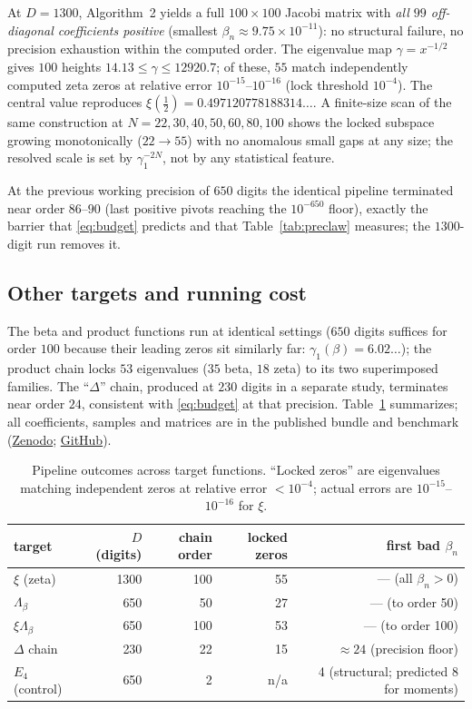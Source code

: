 \documentclass[11pt]{article}
\theoremstyle{definition}
\begin{document}
At $D=1300$, Algorithm~2 yields a full $100\times100$
Jacobi matrix with \emph{all $99$ off-diagonal coefficients
positive} (smallest $\beta_n\approx 9.75\times10^{-11}$): no
structural failure, no precision exhaustion within the computed
order. The eigenvalue map $\gamma=x^{-1/2}$ gives $100$ heights
$14.13\le\gamma\le 12920.7$; of these, $55$ match independently
computed zeta zeros at relative error $10^{-15}$--$10^{-16}$
(lock threshold $10^{-4}$). The central value reproduces
$\xi(\tfrac12)=0.497120778188314\ldots$. A finite-size scan of the
same construction at $N=22,30,40,50,60,80,100$ shows the locked
subspace growing monotonically ($22\to55$) with no anomalous small
gaps at any size; the resolved scale is set by $\gamma_1^{-2N}$, not
by any statistical feature.

At the previous working precision of $650$ digits the identical
pipeline terminated near order $86$--$90$ (last positive pivots
reaching the $10^{-650}$ floor), exactly the barrier that
\eqref{eq:budget} predicts and that Table~\ref{tab:preclaw}
measures; the $1300$-digit run removes it.

\subsection{Other targets and running cost}

The beta and product functions run at identical settings ($650$
digits suffices for order $100$ because their leading zeros sit
similarly far: $\gamma_1(\beta)=6.02\ldots$); the product chain
locks $53$ eigenvalues ($35$ beta, $18$ zeta) to its two
superimposed families. The ``$\Delta$'' chain, produced at $230$
digits in a separate study, terminates near order $24$, consistent
with \eqref{eq:budget} at that precision. Table~\ref{tab:targets}
summarizes; all coefficients, samples and matrices are in the
published bundle and benchmark
(\href{https://doi.org/10.5281/zenodo.22181443}{Zenodo};
\href{https://github.com/maomao8412/hilbert-polya-jacobi}{GitHub}).

\begin{table}[ht]\centering\small
\begin{tabular}{lrrrr}
\toprule
target & $D$ (digits) & chain order & locked zeros & first bad $\beta_n$\\
\midrule
$\xi$ (zeta)        & 1300 & 100 & 55 & --- (all $\beta_n>0$)\\
$\Lambda_\beta$     & 650  & 50  & 27 & --- (to order 50)\\
$\xi\Lambda_\beta$  & 650  & 100 & 53 & --- (to order 100)\\
$\Delta$ chain      & 230  & 22  & 15 & $\approx 24$ (precision floor)\\
$E_4$ (control)     & 650  & 2   & n/a & 4 (structural; predicted 8 for moments)\\
\bottomrule
\end{tabular}
\caption{Pipeline outcomes across target functions. ``Locked zeros''
are eigenvalues matching independent zeros at relative error
$<10^{-4}$; actual errors are $10^{-15}$--$10^{-16}$ for $\xi$.}
\label{tab:targets}
\end{table}
\end{document}
